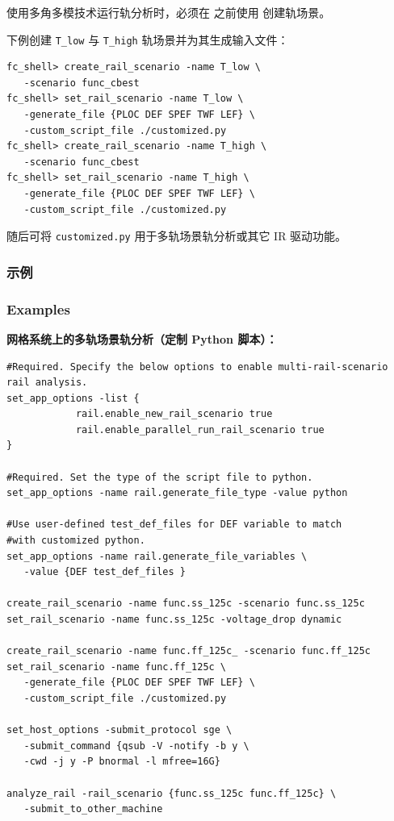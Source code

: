 \begin{noteBox}
使用多角多模技术运行轨分析时，必须在  之前使用  创建轨场景。
\end{noteBox}

下例创建 \texttt{T\_low} 与 \texttt{T\_high} 轨场景并为其生成输入文件：
\begin{lstlisting}
fc_shell> create_rail_scenario -name T_low \
   -scenario func_cbest
fc_shell> set_rail_scenario -name T_low \
   -generate_file {PLOC DEF SPEF TWF LEF} \
   -custom_script_file ./customized.py
fc_shell> create_rail_scenario -name T_high \
   -scenario func_cbest
fc_shell> set_rail_scenario -name T_high \
   -generate_file {PLOC DEF SPEF TWF LEF} \
   -custom_script_file ./customized.py
\end{lstlisting}

随后可将 \texttt{customized.py} 用于多轨场景轨分析或其它 IR 驱动功能。

\subsubsection{示例}
\subsubsection*{Examples}

\textbf{网格系统上的多轨场景轨分析（定制 Python 脚本）：}
\begin{lstlisting}
#Required. Specify the below options to enable multi-rail-scenario rail analysis.
set_app_options -list {
            rail.enable_new_rail_scenario true
            rail.enable_parallel_run_rail_scenario true
}

#Required. Set the type of the script file to python.
set_app_options -name rail.generate_file_type -value python

#Use user-defined test_def_files for DEF variable to match
#with customized python.
set_app_options -name rail.generate_file_variables \
   -value {DEF test_def_files }

create_rail_scenario -name func.ss_125c -scenario func.ss_125c
set_rail_scenario -name func.ss_125c -voltage_drop dynamic

create_rail_scenario -name func.ff_125c_ -scenario func.ff_125c
set_rail_scenario -name func.ff_125c \
   -generate_file {PLOC DEF SPEF TWF LEF} \
   -custom_script_file ./customized.py

set_host_options -submit_protocol sge \
   -submit_command {qsub -V -notify -b y \
   -cwd -j y -P bnormal -l mfree=16G}

analyze_rail -rail_scenario {func.ss_125c func.ff_125c} \
   -submit_to_other_machine
\end{lstlisting}

